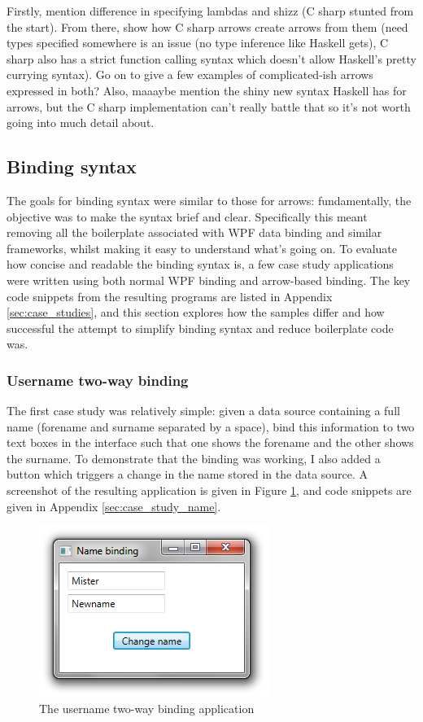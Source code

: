 \documentclass[12pt,twoside,notitlepage]{report}
\begin{document}
Firstly, mention difference in specifying lambdas and shizz (C sharp stunted from the start). From there, show how C sharp arrows create arrows from them (need types specified somewhere is an issue (no type inference like Haskell gets), C sharp also has a strict function calling syntax which doesn't allow Haskell's pretty currying syntax). Go on to give a few examples of complicated-ish arrows expressed in both? Also, maaaybe mention the shiny new syntax Haskell has for arrows, but the C sharp implementation can't really battle that so it's not worth going into much detail about.


\subsection{Binding syntax}

The goals for binding syntax were similar to those for arrows: fundamentally, the objective was to make the syntax brief and clear. Specifically this meant removing all the boilerplate associated with WPF data binding and similar frameworks, whilst making it easy to understand what's going on. To evaluate how concise and readable the binding syntax is, a few case study applications were written using both normal WPF binding and arrow-based binding. The key code snippets from the resulting programs are listed in Appendix \ref{sec:case_studies}, and this section explores how the samples differ and how successful the attempt to simplify binding syntax and reduce boilerplate code was.

\subsubsection{Username two-way binding}

The first case study was relatively simple: given a data source containing a full name (forename and surname separated by a space), bind this information to two text boxes in the interface such that one shows the forename and the other shows the surname. To demonstrate that the binding was working, I also added a button which triggers a change in the name stored in the data source. A screenshot of the resulting application is given in Figure \ref{fig:case_study_name}, and code snippets are given in Appendix \ref{sec:case_study_name}.

\begin{figure}[!ht]
  \centering
  \includegraphics{fig/CaseStudyNameBinding.png}
  \caption{The username two-way binding application}
  \label{fig:case_study_name}
\end{figure}
\end{document}
